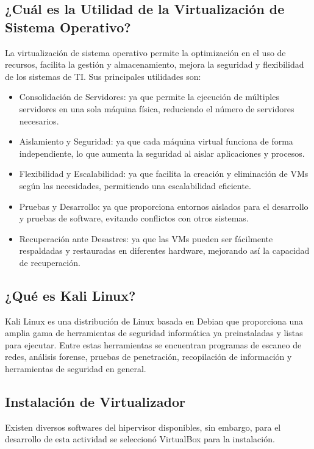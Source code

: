 \documentclass[stu, 11pt, letterpaper, donotrepeattitle, floatsintext, natbib]{apa7}
\begin{document}
\subsection{¿Cuál es la Utilidad de la Virtualización de Sistema Operativo? } 
La virtualización de sistema operativo permite la optimización en el uso de recursos, facilita la gestión y almacenamiento, mejora la seguridad y flexibilidad de los sistemas de TI. Sus principales utilidades son:
 
\begin{itemize}
\item  Consolidación de Servidores: ya que permite la ejecución de múltiples servidores en una sola máquina física, reduciendo el número de servidores necesarios. 
\item Aislamiento y Seguridad: ya que cada máquina virtual funciona de forma independiente, lo que aumenta la seguridad al aislar aplicaciones y procesos. 
\item Flexibilidad y Escalabilidad: ya que facilita la creación y eliminación de VMs según las necesidades, permitiendo una escalabilidad eficiente. 
\item Pruebas y Desarrollo: ya que proporciona entornos aislados para el desarrollo y pruebas de software, evitando conflictos con otros sistemas.
\item  Recuperación ante Desastres: ya que las VMs pueden ser fácilmente respaldadas y restauradas en diferentes hardware, mejorando así la capacidad de recuperación.
\end{itemize}

 \subsection{¿Qué es Kali Linux? }
 
 Kali Linux es una distribución de Linux basada en Debian que proporciona una amplia gama de herramientas de seguridad informática ya preinstaladas y listas para ejecutar. Entre estas herramientas se encuentran programas de escaneo de redes, análisis forense, pruebas de penetración, recopilación de información y herramientas de seguridad en general.  

\subsection{Instalación de Virtualizador }

Existen diversos softwares del hipervisor disponibles, sin embargo, para el desarrollo de esta actividad se seleccionó VirtualBox para la instalación.  
\end{document}

